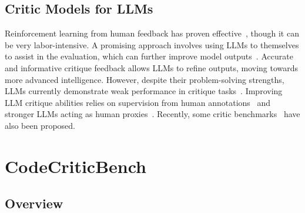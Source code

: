 \documentclass[11pt, a4paper, logo, copyright, nonumbering, amsart]{map}
\begin{document}
\begin{CJK*}{UTF8}{gbsn}
\subsection{Critic Models for LLMs}

Reinforcement learning from human feedback has proven effective~\cite{achiam2023gpt}, though it can be very labor-intensive. A promising approach involves using LLMs to themselves to assist in the evaluation, which can further improve model outputs~\cite{saunders2022self, mcaleese2024llm}. Accurate and informative critique feedback allows LLMs to refine outputs, moving towards more advanced intelligence. However, despite their problem-solving strengths, LLMs currently demonstrate weak performance in critique tasks~\citep{zheng2024critic, yang2024supercorrect}. Improving LLM critique abilities relies on supervision from human annotations~\cite{saunders2022self,mcaleese2024llm} and stronger LLMs acting as human proxies~\cite{lan2024training,zhang2024generative,ke2024critiquellm,ankner2024critique,zheng2024critic,yang2024supercorrect,sharma2024critical}.
Recently, some critic benchmarks~\citep{zheng2024critic,tang2025real} have also been proposed.

\section{CodeCriticBench}

\subsection{Overview}


\end{CJK*}
\end{document}
